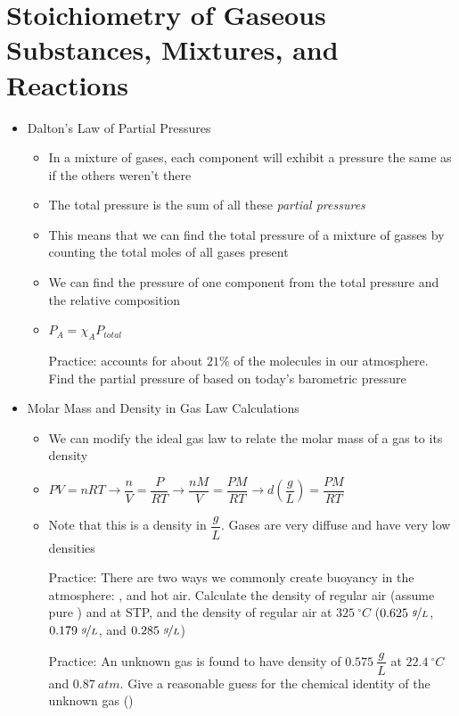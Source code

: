 \documentclass[12pt, openany, letterpaper]{memoir}
\begin{document}
\section{Stoichiometry of Gaseous Substances, Mixtures, and Reactions}
\begin{itemize}
  \item Dalton's Law of Partial Pressures
    \begin{itemize}
      \item In a mixture of gases, each component will exhibit a pressure the same as if the others weren't there
      \item The total pressure is the sum of all these \emph{partial pressures}
      \item This means that we can find the total pressure of a mixture of gasses by counting the total moles of all gases present
      \item We can find the pressure of one component from the total pressure and the relative composition
      \item $P_A=\chi_A P_{total}$

            Practice:  accounts for about $21\%$ of the molecules in our atmosphere. Find the partial pressure of  based on today's barometric pressure
    \end{itemize}
  \item Molar Mass and Density in Gas Law Calculations
    \begin{itemize}
      \item We can modify the ideal gas law to relate the molar mass of a gas to its density
      \item $PV=nRT \rightarrow \dfrac{n}{V}=\dfrac{P}{RT} \rightarrow \dfrac{nM}{V} = \dfrac{PM}{RT} \rightarrow d\left(\dfrac{g}{L}\right)=\dfrac{PM}{RT}$
      \item Note that this is a density in $\dfrac{g}{L}$. Gases are very diffuse and have very low densities

            Practice: There are two ways we commonly create buoyancy in the atmosphere: , and hot air. Calculate the density of regular air (assume pure ) and  at STP, and the density of regular air at $325~^\circ C$ ($0.625~\nicefrac{g}{L}$, $0.179~\nicefrac{g}{L}$, and $0.285~\nicefrac{g}{L}$)

            Practice: An unknown gas is found to have density of $0.575~\dfrac{g}{L}$ at $22.4~^\circ C$ and $0.87~atm$. Give a reasonable guess for the chemical identity of the unknown gas ()


\end{itemize}
\end{itemize}
\end{document}
